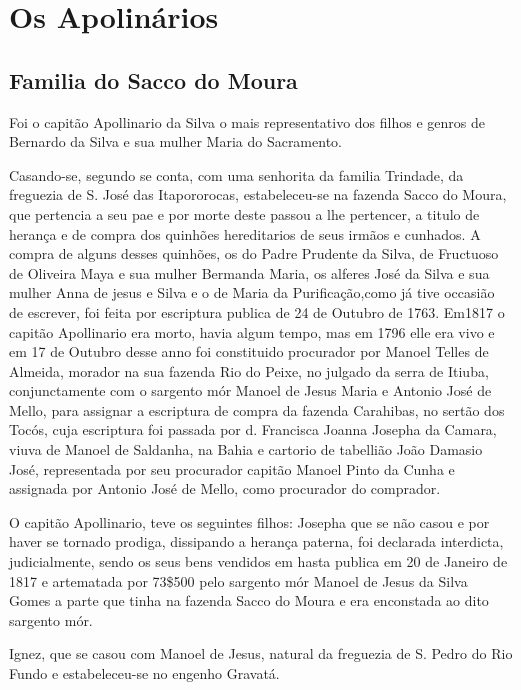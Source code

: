 \chapter{Os Apolinários}

\begin{centering}
	\section*{Familia do Sacco do Moura}
\end{centering}

Foi o capitão Apollinario da Silva o mais representativo dos filhos e genros de Bernardo
da Silva e sua mulher Maria do Sacramento.

Casando-se, segundo se conta, com uma senhorita da familia Trindade, da freguezia de S. José das Itapororocas, estabeleceu-se na fazenda Sacco do Moura, que pertencia a seu pae e por morte deste passou a lhe pertencer, a titulo de herança e de compra dos quinhões hereditarios de seus irmãos e cunhados. A compra de alguns desses quinhões, os do Padre Prudente da Silva, de Fructuoso de Oliveira Maya e sua mulher Bermanda Maria, os alferes José da Silva e sua mulher Anna de jesus e Silva e o de Maria da Purificação,como já tive occasião de escrever, foi feita por escriptura publica de 24 de Outubro de 1763. Em1817 o capitão Apollinario era morto, havia algum tempo, mas em 1796 elle era vivo e em 17 de Outubro desse anno foi constituido procurador por Manoel Telles de Almeida, morador na sua fazenda Rio do Peixe, no julgado da serra de Itiuba, conjunctamente com o sargento mór Manoel de Jesus Maria e Antonio José de Mello, para assignar a escriptura de compra da fazenda Carahibas, no sertão dos Tocós, cuja escriptura foi passada por d. Francisca Joanna Josepha da Camara, viuva de Manoel de Saldanha, na Bahia e cartorio de tabellião João Damasio José, representada por seu procurador capitão Manoel Pinto da Cunha e assignada por Antonio José de Mello, como procurador do comprador.

O capitão Apollinario, teve os seguintes filhos: Josepha que se não casou e por haver se tornado prodiga, dissipando a herança paterna, foi  declarada interdicta, judicialmente, sendo os seus bens vendidos em hasta publica em 20 de Janeiro de 1817 e artematada por 73\$500 pelo sargento mór Manoel de Jesus da Silva Gomes a parte que tinha na fazenda Sacco do Moura e era enconstada ao dito sargento mór.

Ignez, que se casou com Manoel de Jesus, natural da freguezia de S. Pedro do Rio Fundo e estabeleceu-se no engenho Gravatá.

